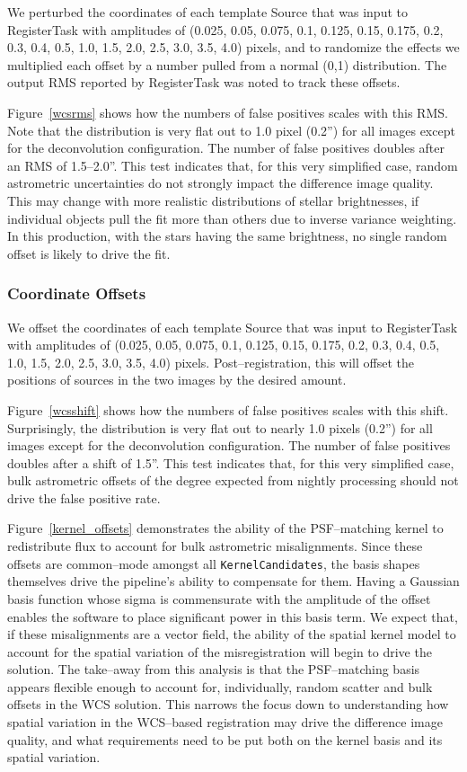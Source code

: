 \documentclass[prd, nofootinbib, floatfix, 11pt,tightenlines,times]{article}
\begin{document}
We perturbed the coordinates of each template Source that was input to
RegisterTask with amplitudes of (0.025, 0.05, 0.075, 0.1, 0.125, 0.15,
0.175, 0.2, 0.3, 0.4, 0.5, 1.0, 1.5, 2.0, 2.5, 3.0, 3.5, 4.0) pixels,
and to randomize the effects we multiplied each offset by a number
pulled from a normal (0,1) distribution.  The output RMS reported by
RegisterTask was noted to track these offsets.  

Figure~\ref{wcsrms} shows how the numbers of false positives scales
with this RMS.  Note that the distribution is very flat out to 1.0
pixel (0.2'') for all images except for the deconvolution
configuration.  The number of false positives doubles after an RMS of
1.5--2.0''.  This test indicates that, for this very simplified case,
random astrometric uncertainties do not strongly impact the difference
image quality.  This may change with more realistic distributions of
stellar brightnesses, if individual objects pull the fit more than
others due to inverse variance weighting.  In this production, with the
stars having the same brightness, no single random offset is likely to
drive the fit.

\subsubsection{Coordinate Offsets}

We offset the coordinates of each template Source that was input to
RegisterTask with amplitudes of (0.025, 0.05, 0.075, 0.1, 0.125, 0.15,
0.175, 0.2, 0.3, 0.4, 0.5, 1.0, 1.5, 2.0, 2.5, 3.0, 3.5, 4.0) pixels.
Post--registration, this will offset the positions of sources in the
two images by the desired amount.

Figure~\ref{wcsshift} shows how the numbers of false positives scales
with this shift.  Surprisingly, the distribution is very flat out to
nearly 1.0 pixels (0.2'') for all images except for the deconvolution
configuration.  The number of false positives doubles after a shift of
1.5''.  This test indicates that, for this very simplified case, bulk
astrometric offsets of the degree expected from nightly processing
should not drive the false positive rate.  

Figure~\ref{kernel_offsets} demonstrates the ability of the
PSF--matching kernel to redistribute flux to account for bulk
astrometric misalignments.  Since these offsets are common--mode
amongst all {\tt KernelCandidates}, the basis shapes themselves drive
the pipeline's ability to compensate for them.  Having a Gaussian
basis function whose sigma is commensurate with the amplitude of the
offset enables the software to place significant power in this basis
term.  We expect that, if these misalignments are a vector field, the
ability of the spatial kernel model to account for the spatial
variation of the misregistration will begin to drive the solution.
The take--away from this analysis is that the PSF--matching basis
appears flexible enough to account for, individually, random scatter
and bulk offsets in the WCS solution.  This narrows the focus down to
understanding how spatial variation in the WCS--based registration may
drive the difference image quality, and what requirements need to be
put both on the kernel basis and its spatial variation.
\end{document}
